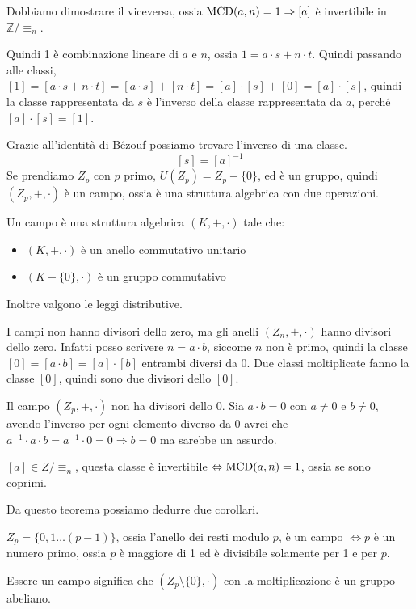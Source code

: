 Dobbiamo dimostrare il viceversa, ossia $\operatorname{MCD}(a, n) = 1 \Rightarrow [a]$ \`e invertibile in $\mathbb{Z} / \equiv_n$.

Quindi 1 \`e combinazione lineare di $a$ e $n$, ossia $1 = a \cdot s + n \cdot t$. Quindi passando alle classi, $[1] = [a \cdot s + n \cdot t] = [a \cdot s] + [n \cdot t] = [a] \cdot [s] + [0] = [a] \cdot [s]$, quindi la classe rappresentata da $s$ \`e l'inverso della classe rappresentata da $a$, perch\'e $[a] \cdot [s] = [1]$.

Grazie all'identit\`a di B\'ezouf possiamo trovare l'inverso di una classe.
\[
[s] = [a]^{-1}
\]
Se prendiamo $Z_p$ con $p$ primo, $U(Z_p) = Z_p - \{ 0 \}$, ed \`e un gruppo, quindi $(Z_p, +, \cdot)$ \`e un campo, ossia \`e una struttura algebrica con due operazioni.

Un campo \`e una struttura algebrica $(K, +, \cdot)$ tale che:
\begin{itemize}
    \item $(K, +, \cdot)$ \`e un anello commutativo unitario
    \item $(K - \{0\}, \cdot)$ \`e un gruppo commutativo
\end{itemize}
Inoltre valgono le leggi distributive.

I campi non hanno divisori dello zero, ma gli anelli $(Z_n, +, \cdot)$ hanno divisori dello zero. Infatti posso scrivere $n = a \cdot b$, siccome $n$ non \`e primo, quindi la classe $[0] = [a \cdot b] = [a] \cdot [b]$ entrambi diversi da 0. Due classi moltiplicate fanno la classe $[0]$, quindi sono due divisori dello $[0]$.

Il campo $(Z_p, +, \cdot)$ non ha divisori dello 0. Sia $a \cdot  b = 0$ con $a \neq 0$ e $b \neq 0$, avendo l'inverso per ogni elemento diverso da 0 avrei che $a^{-1} \cdot a \cdot b = a^{-1} \cdot 0 = 0 \Rightarrow b = 0$ ma sarebbe un assurdo.

\begin{theorem}
$[a] \in Z / \equiv_n$, questa classe \`e invertibile $\Leftrightarrow \operatorname{MCD}(a, n) = 1$, ossia se sono coprimi.
\end{theorem}

Da questo teorema possiamo dedurre due corollari.

\begin{cor}\label{corollario_interi_primo}
$Z_p = \{ 0, 1 \dots (p-1) \}$, ossia l'anello dei resti modulo $p$, \`e un campo $\Leftrightarrow p$ \`e un numero primo, ossia $p$ \`e maggiore di 1 ed \`e divisibile solamente per 1 e per $p$.

Essere un campo significa che $(Z_p \setminus \{ 0 \}, \cdot)$ con la moltiplicazione \`e un gruppo abeliano.
\end{cor}

